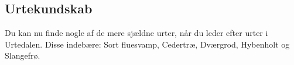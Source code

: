 \subsection*{Urtekundskab}
Du kan nu finde nogle af de mere sjældne urter, når du leder efter urter i Urtedalen. Disse indebære: Sort fluesvamp, Cedertræ, Dværgrod, Hybenholt og Slangefrø.\\